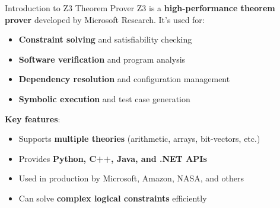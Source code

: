 \documentclass{beamer}
\begin{document}
\begin{frame}[t]{Introduction to Z3 Theorem Prover}
Z3 is a \textbf{high-performance theorem prover} developed by Microsoft Research. It's used for:
\begin{itemize}
\item \textbf{Constraint solving} and satisfiability checking
\item \textbf{Software verification} and program analysis
\item \textbf{Dependency resolution} and configuration management
\item \textbf{Symbolic execution} and test case generation
\end{itemize}

\bigskip

\textbf{Key features}:
\begin{itemize}
\scriptsize
\item Supports \textbf{multiple theories} (arithmetic, arrays, bit-vectors, etc.)
\item Provides \textbf{Python, C++, Java, and .NET APIs}
\item Used in production by Microsoft, Amazon, NASA, and others
\item Can solve \textbf{complex logical constraints} efficiently
\end{itemize}
\end{frame}
\end{document}
